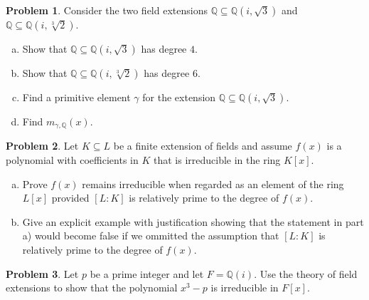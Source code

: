 \documentclass[11pt]{article}
\newcommand{\Q}{\mathbb{Q}}
\theoremstyle{definition}
\newtheorem{problem}{Problem}
\begin{document}
\begin{problem}
Consider the two field extensions $\Q \subseteq \Q(i, \sqrt{3})$ and
$\Q \subseteq \Q(i, \sqrt[3]{2})$.

\begin{enumerate}[a)]
\item Show that $\Q \subseteq \Q(i, \sqrt{3})$ has degree $4$. 

\item Show that $\Q \subseteq \Q(i, \sqrt[3]{2})$ has degree $6$.
  
\item Find a primitive element $\gamma$ for the extension $\Q \subseteq \Q(i, \sqrt{3})$.

\item Find $m_{\gamma, \Q}(x)$.
\end{enumerate}
\end{problem}



\begin{problem}
Let $K \subseteq L$ be a finite extension of fields and assume $f(x)$ is a polynomial with coefficients in $K$ that is irreducible in the ring $K[x]$. 

\begin{enumerate}[a)]
\item Prove $f(x)$ remains irreducible when regarded as an element of the ring $L[x]$ provided $[L : K]$ is relatively prime to the degree of $f(x)$.

\item Give an explicit example with justification showing that the statement in part a) would become false if we ommitted the assumption that $[L : K]$ is relatively prime to the degree of $f(x)$.
\end{enumerate}
\end{problem}


\begin{problem}
Let $p$ be a prime integer and let $F = \Q(i)$. Use the theory of field extensions to show that the polynomial $x^3 - p$ is irreducible in $F[x]$.
\end{problem}
\end{document}
